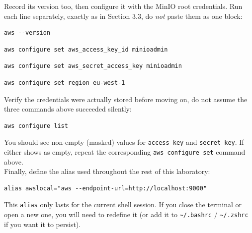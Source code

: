 \noindent
Record its version too, then configure it with the MinIO root credentials. Run each line separately, exactly as in
Section 3.3, do \emph{not} paste them as one block:
\begin{lstlisting}
aws --version
\end{lstlisting}
\begin{lstlisting}
aws configure set aws_access_key_id minioadmin
\end{lstlisting}
\begin{lstlisting}
aws configure set aws_secret_access_key minioadmin
\end{lstlisting}
\begin{lstlisting}
aws configure set region eu-west-1
\end{lstlisting}

\noindent
Verify the credentials were actually stored before moving on, do not assume the three commands
above succeeded silently: 

\begin{lstlisting}
aws configure list
\end{lstlisting}

\noindent
You should see non-empty (masked) values for \texttt{access\_key} and \texttt{secret\_key}. If either shows as empty, repeat the corresponding \texttt{aws configure set} command above.
\\
Finally, define the alias used throughout the rest of this laboratory:
\begin{lstlisting}
alias awslocal="aws --endpoint-url=http://localhost:9000"
\end{lstlisting}

\begin{warningbox}
This \texttt{alias} only lasts for the current shell session. If you close the terminal or open a
new one, you will need to redefine it (or add it to \texttt{\textasciitilde/.bashrc} /
\texttt{\textasciitilde/.zshrc} if you want it to persist).
\end{warningbox}

